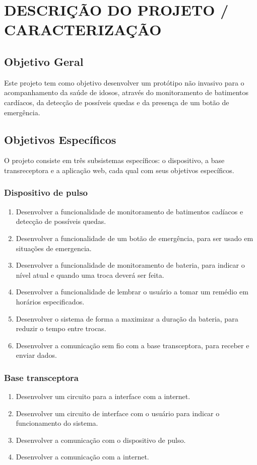 \documentclass[a4paper]{article}
\begin{document}
\section{DESCRIÇÃO DO PROJETO / CARACTERIZAÇÃO}

\subsection{Objetivo Geral}
Este projeto tem como objetivo desenvolver um protótipo não invasivo para o acompanhamento da saúde de idosos, através do monitoramento de batimentos cardíacos, da detecção de possíveis quedas e da presença de um botão de emergência.

\subsection{Objetivos Específicos}
O projeto consiste em três subsistemas específicos: o dispositivo, a base transreceptora e a aplicação web, cada qual com seus objetivos específicos.

\subsubsection{Dispositivo de pulso}
\begin{enumerate}
\item Desenvolver a funcionalidade de monitoramento de batimentos cadíacos e detecção de possíveis quedas.
\item Desenvolver a funcionalidade de um botão de emergência, para ser usado em situações de emergencia.
\item Desenvolver a funcionalidade de monitoramento de bateria, para indicar o nível atual e quando uma troca deverá ser feita.
\item Desenvolver a funcionalidade de lembrar o usuário a tomar um remédio em horários especificados.
\item Desenvolver o sistema de forma a maximizar a duração da bateria, para reduzir o tempo entre trocas.
\item Desenvolver a comunicação sem fio com a base transceptora, para receber e enviar dados. 
\end{enumerate}

\subsubsection{Base transceptora}
\begin{enumerate}
\item Desenvolver um circuito para a interface com a internet.
\item Desenvolver um circuito de interface com o usuário para indicar o funcionamento do sistema.
\item Desenvolver a comunicação com o dispositivo de pulso.
\item Desenvolver a comunicação com a internet.
\end{enumerate}
\end{document}
